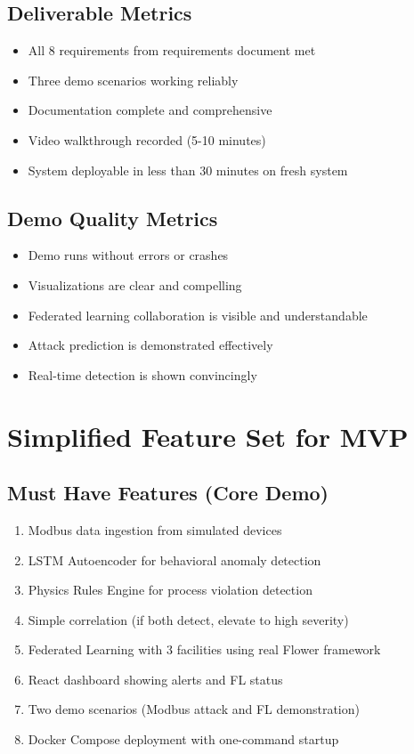 \documentclass[12pt,a4paper]{article}
\begin{document}
\subsection{Deliverable Metrics}

\begin{itemize}[leftmargin=1cm,itemsep=0pt]
    \item All 8 requirements from requirements document met
    \item Three demo scenarios working reliably
    \item Documentation complete and comprehensive
    \item Video walkthrough recorded (5-10 minutes)
    \item System deployable in less than 30 minutes on fresh system
\end{itemize}

\subsection{Demo Quality Metrics}

\begin{itemize}[leftmargin=1cm,itemsep=0pt]
    \item Demo runs without errors or crashes
    \item Visualizations are clear and compelling
    \item Federated learning collaboration is visible and understandable
    \item Attack prediction is demonstrated effectively
    \item Real-time detection is shown convincingly
\end{itemize}

\section{Simplified Feature Set for MVP}

\subsection{Must Have Features (Core Demo)}

\begin{enumerate}[leftmargin=1cm,itemsep=0pt]
    \item Modbus data ingestion from simulated devices
    \item LSTM Autoencoder for behavioral anomaly detection
    \item Physics Rules Engine for process violation detection
    \item Simple correlation (if both detect, elevate to high severity)
    \item Federated Learning with 3 facilities using real Flower framework
    \item React dashboard showing alerts and FL status
    \item Two demo scenarios (Modbus attack and FL demonstration)
    \item Docker Compose deployment with one-command startup
\end{enumerate}
\end{document}
